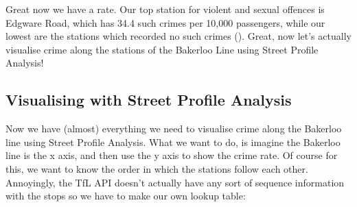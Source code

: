 \documentclass[
  krantz2]{krantz}
\makeatletter
\newenvironment{Shaded}{\begin{snugshade}}{\end{snugshade}}
\newcommand{\DecValTok}[1]{\textcolor[rgb]{0.06,0.06,0.06}{#1}}
\newcommand{\NormalTok}[1]{#1}
\newcommand{\OtherTok}[1]{\textcolor[rgb]{0.37,0.37,0.37}{#1}}
\newcommand{\SpecialCharTok}[1]{\textcolor[rgb]{0,0,0}{#1}}
\newenvironment{kframe}{%
\medskip{}
\setlength{\fboxsep}{.8em}
 \def\at@end@of@kframe{}%
 \ifinner\ifhmode%
  \def\at@end@of@kframe{\end{minipage}}%
  \begin{minipage}{\columnwidth}%
 \fi\fi%
 \def\FrameCommand##1{\hskip\@totalleftmargin \hskip-\fboxsep
 \colorbox{shadecolor}{##1}\hskip-\fboxsep
     \hskip-\linewidth \hskip-\@totalleftmargin \hskip\columnwidth}%
 \MakeFramed {\advance\hsize-\width
   \@totalleftmargin\z@ \linewidth\hsize
   \@setminipage}}%
 {\par\unskip\endMakeFramed%
 \at@end@of@kframe}
\renewenvironment{Shaded}{\begin{kframe}}{\end{kframe}}
\makeatother
\begin{document}
\begin{Shaded}
\end{Shaded}

Great now we have a rate. Our top station for violent and sexual offences is Edgware Road, which has 34.4 such crimes per 10,000 passengers, while our lowest are the stations which recorded no such crimes (). Great, now let's actually visualise crime along the stations of the Bakerloo Line using Street Profile Analysis!

\hypertarget{visualising-with-street-profile-analysis}{%
\subsection{Visualising with Street Profile Analysis}\label{visualising-with-street-profile-analysis}}

Now we have (almost) everything we need to visualise crime along the Bakerloo line using Street Profile Analysis. What we want to do, is imagine the Bakerloo line is the x axis, and then use the y axis to show the crime rate. Of course for this, we want to know the order in which the stations follow each other. Annoyingly, the TfL API doesn't actually have any sort of sequence information with the stops so we have to make our own lookup table:
\end{document}

